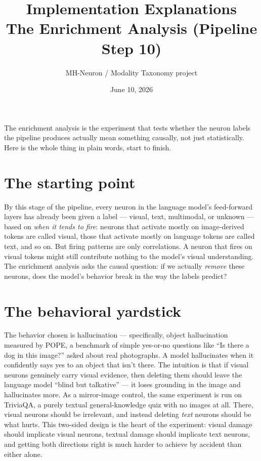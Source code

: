 \documentclass[11pt,a4paper]{article}
\title{Implementation Explanations\\[0.4em]\large The Enrichment Analysis (Pipeline Step 10)}
\author{MH-Neuron / Modality Taxonomy project}
\date{June 10, 2026}
\begin{document}
\maketitle

The enrichment analysis is the experiment that tests whether the neuron labels the
pipeline produces actually mean something causally, not just statistically. Here is
the whole thing in plain words, start to finish.

\section*{The starting point}

By this stage of the pipeline, every neuron in the language model's feed-forward
layers has already been given a label --- visual, text, multimodal, or unknown ---
based on \emph{when it tends to fire}: neurons that activate mostly on image-derived
tokens are called visual, those that activate mostly on language tokens are called
text, and so on. But firing patterns are only correlations. A neuron that fires on
visual tokens might still contribute nothing to the model's visual understanding.
The enrichment analysis asks the causal question: if we actually \emph{remove} these
neurons, does the model's behavior break in the way the labels predict?

\section*{The behavioral yardstick}

The behavior chosen is hallucination --- specifically, object hallucination measured
by POPE, a benchmark of simple yes-or-no questions like ``Is there a dog in this
image?'' asked about real photographs. A model hallucinates when it confidently says
yes to an object that isn't there. The intuition is that if visual neurons genuinely
carry visual evidence, then deleting them should leave the language model ``blind
but talkative'' --- it loses grounding in the image and hallucinates more. As a
mirror-image control, the same experiment is run on TriviaQA, a purely textual
general-knowledge quiz with no images at all. There, visual neurons should be
irrelevant, and instead deleting \emph{text} neurons should be what hurts. This
two-sided design is the heart of the experiment: visual damage should implicate
visual neurons, textual damage should implicate text neurons, and getting both
directions right is much harder to achieve by accident than either alone.
\end{document}
